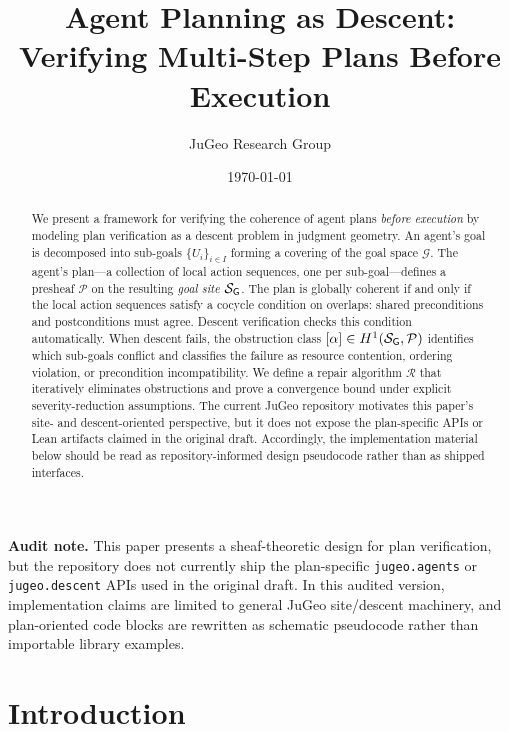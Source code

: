 \documentclass[11pt]{article}
\title{\textbf{Agent Planning as Descent:\\
Verifying Multi-Step Plans Before Execution}}
\author{%
  JuGeo Research Group
}
\date{\today}
\newcommand{\PlanSheaf}{\mathcal{P}}
\newcommand{\GoalSite}{\Site_{\mathsf{G}}}
\newcommand{\GoalSpace}{\mathcal{G}}
\newcommand{\CoverFam}{\{U_i\}_{i \in I}}
\newcommand{\RepairOp}{\mathcal{R}}
\begin{document}
\maketitle

\noindent\textbf{Audit note.}
This paper presents a sheaf-theoretic design for plan verification, but
the repository does not currently ship the plan-specific \texttt{jugeo.agents}
or \texttt{jugeo.descent} APIs used in the original draft.  In this audited
version, implementation claims are limited to general JuGeo site/descent
machinery, and plan-oriented code blocks are rewritten as schematic
pseudocode rather than importable library examples.

\begin{abstract}
We present a framework for verifying the coherence of agent plans
\emph{before execution} by modeling plan verification as a descent
problem in judgment geometry.  An agent's goal is decomposed into
sub-goals $\CoverFam$ forming a covering of the goal space
$\GoalSpace$.  The agent's plan---a collection of local action
sequences, one per sub-goal---defines a presheaf $\PlanSheaf$ on
the resulting \emph{goal site} $\GoalSite$.  The plan is globally
coherent if and only if the local action sequences satisfy a cocycle
condition on overlaps: shared preconditions and postconditions must
agree.  Descent verification checks this condition automatically.
When descent fails, the obstruction class
$[\alpha] \in \Hcoh{1}(\GoalSite, \PlanSheaf)$ identifies which
sub-goals conflict and classifies the failure as resource contention,
ordering violation, or precondition incompatibility.  We define a
repair algorithm $\RepairOp$ that iteratively eliminates obstructions
and prove a convergence bound under explicit severity-reduction
assumptions.  The current JuGeo repository motivates this paper's
site- and descent-oriented perspective, but it does not expose the
plan-specific APIs or Lean artifacts claimed in the original draft.
Accordingly, the implementation material below should be read as
repository-informed design pseudocode rather than as shipped interfaces.
\end{abstract}

\newpage

\section{Introduction}\label{sec:intro}
\end{document}
